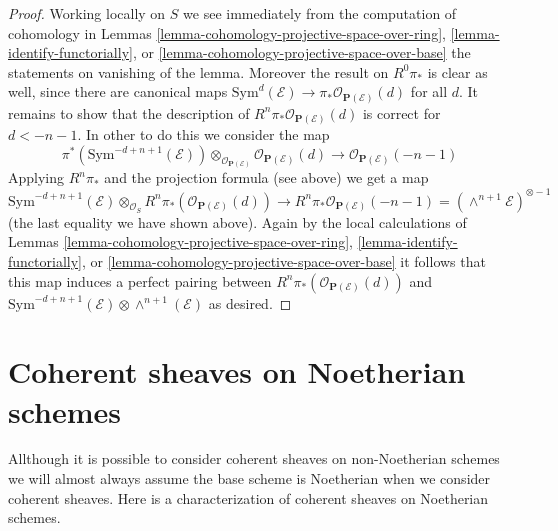 \begin{proof}
\medskip\noindent
Working locally on $S$ we see immediately from the computation of
cohomology in Lemmas \ref{lemma-cohomology-projective-space-over-ring},
\ref{lemma-identify-functorially}, or
\ref{lemma-cohomology-projective-space-over-base} the statements on
vanishing of the lemma. Moreover the result on $R^0\pi_*$ is clear
as well, since there are canonical maps
$\text{Sym}^d(\mathcal{E}) \to \pi_* \mathcal{O}_{\mathbf{P}(\mathcal{E})}(d)$
for all $d$. It remains to show that the description of
$R^n\pi_*\mathcal{O}_{\mathbf{P}(\mathcal{E})}(d)$ is correct
for $d < -n - 1$. In other to do this we consider the map
$$
\pi^*(\text{Sym}^{-d + n + 1}(\mathcal{E}))
\otimes_{\mathcal{O}_{\mathbf{P}(\mathcal{E})}}
\mathcal{O}_{\mathbf{P}(\mathcal{E})}(d)
\longrightarrow
\mathcal{O}_{\mathbf{P}(\mathcal{E})}(-n - 1)
$$
Applying $R^n\pi_*$ and the projection formula (see above) we get a map
$$
\text{Sym}^{-d + n + 1}(\mathcal{E})
\otimes_{\mathcal{O}_S}
R^n\pi_*(\mathcal{O}_{\mathbf{P}(\mathcal{E})}(d))
\longrightarrow
R^n\pi_*\mathcal{O}_{\mathbf{P}(\mathcal{E})}(-n - 1) =
(\wedge^{n + 1}\mathcal{E})^{\otimes -1}
$$
(the last equality we have shown above).
Again by the local calculations of Lemmas
\ref{lemma-cohomology-projective-space-over-ring},
\ref{lemma-identify-functorially}, or
\ref{lemma-cohomology-projective-space-over-base}
it follows that this map induces a perfect pairing between
$R^n\pi_*(\mathcal{O}_{\mathbf{P}(\mathcal{E})}(d))$ and
$\text{Sym}^{-d + n + 1}(\mathcal{E}) \otimes \wedge^{n + 1}(\mathcal{E})$
as desired.
\end{proof}















\section{Coherent sheaves on Noetherian schemes}
\label{section-coherent-sheaves}

\noindent
Allthough it is possible to consider coherent sheaves on non-Noetherian
schemes we will almost always assume the base scheme is Noetherian when
we consider coherent sheaves. Here is a characterization of coherent
sheaves on Noetherian schemes.

